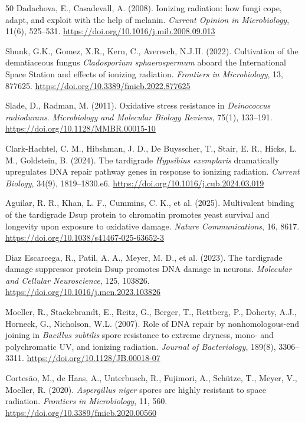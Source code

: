 \documentclass[11pt]{article}
\begin{document}
\begin{thebibliography}{50}
Dadachova, E., Casadevall, A. (2008).
Ionizing radiation: how fungi cope, adapt, and exploit with the help of melanin.
\textit{Current Opinion in Microbiology}, 11(6), 525--531.
\url{https://doi.org/10.1016/j.mib.2008.09.013}

Shunk, G.K., Gomez, X.R., Kern, C., Averesch, N.J.H. (2022).
Cultivation of the dematiaceous fungus \textit{Cladosporium sphaerospermum} aboard the
International Space Station and effects of ionizing radiation.
\textit{Frontiers in Microbiology}, 13, 877625.
\url{https://doi.org/10.3389/fmicb.2022.877625}

Slade, D., Radman, M. (2011).
Oxidative stress resistance in \textit{Deinococcus radiodurans}.
\textit{Microbiology and Molecular Biology Reviews}, 75(1), 133--191.
\url{https://doi.org/10.1128/MMBR.00015-10}

Clark-Hachtel, C. M., Hibshman, J. D., De Buysscher, T., Stair, E. R., Hicks, L. M.,
Goldstein, B. (2024).
The tardigrade \textit{Hypsibius exemplaris} dramatically upregulates DNA repair pathway genes
in response to ionizing radiation.
\textit{Current Biology}, 34(9), 1819--1830.e6.
\url{https://doi.org/10.1016/j.cub.2024.03.019}

Aguilar, R. R., Khan, L. F., Cummins, C. K., et al. (2025).
Multivalent binding of the tardigrade Dsup protein to chromatin promotes yeast survival and
longevity upon exposure to oxidative damage.
\textit{Nature Communications}, 16, 8617.
\url{https://doi.org/10.1038/s41467-025-63652-3}

Diaz Escarcega, R., Patil, A. A., Meyer, M. D., et al. (2023).
The tardigrade damage suppressor protein Dsup promotes DNA damage in neurons.
\textit{Molecular and Cellular Neuroscience}, 125, 103826.
\url{https://doi.org/10.1016/j.mcn.2023.103826}

Moeller, R., Stackebrandt, E., Reitz, G., Berger, T., Rettberg, P., Doherty, A.J.,
Horneck, G., Nicholson, W.L. (2007).
Role of DNA repair by nonhomologous-end joining in \textit{Bacillus subtilis} spore
resistance to extreme dryness, mono- and polychromatic UV, and ionizing radiation.
\textit{Journal of Bacteriology}, 189(8), 3306--3311.
\url{https://doi.org/10.1128/JB.00018-07}

Cortes\~ao, M., de Haas, A., Unterbusch, R., Fujimori, A., Sch\"utze, T., Meyer, V., Moeller, R. (2020).
\textit{Aspergillus niger} spores are highly resistant to space radiation.
\textit{Frontiers in Microbiology}, 11, 560.
\url{https://doi.org/10.3389/fmicb.2020.00560}


\end{thebibliography}
\end{document}
